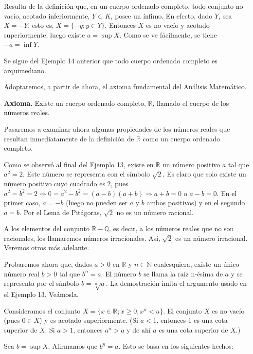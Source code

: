 \documentclass[12pt,oneside]{book}
\begin{document}
Resulta de la definición que, en un cuerpo ordenado completo, todo conjunto no vacío, acotado inferiormente, \( Y \subset K \), posee un ínfimo. En efecto, dado \( Y \), sea \( X = -Y \), esto es, \( X = \{-y ; y \in Y\} \). Entonces \( X \) es no vacío y acotado superiormente; luego existe \( a = \sup X \). Como se ve fácilmente, se tiene \( -a = \inf Y \).

Se sigue del Ejemplo 14 anterior que todo cuerpo ordenado completo es arquimediano.

Adoptaremos, a partir de ahora, el axioma fundamental del Análisis Matemático.

\textbf{Axioma.} Existe un cuerpo ordenado completo, \( \mathbb{R} \), llamado el cuerpo de los números reales.

Pasaremos a examinar ahora algunas propiedades de los números reales que resultan inmediatamente de la definición de \( \mathbb{R} \) como un cuerpo ordenado completo.

Como se observó al final del Ejemplo 13, existe en \(\mathbb{R}\) un número positivo \(a\) tal que \(a^2 = 2\). Este número se representa con el símbolo \(\sqrt{2}\). Es claro que solo existe un número positivo cuyo cuadrado es 2, pues \(a^2 = b^2 = 2 \Rightarrow 0 = a^2 - b^2 = (a-b)(a+b) \Rightarrow a + b = 0\) o \(a - b = 0\). En el primer caso, \(a = -b\) (luego no pueden ser \(a\) y \(b\) ambos positivos) y en el segundo \(a = b\). Por el Lema de Pitágoras, \(\sqrt{2}\) no es un número racional.

A los elementos del conjunto \(\mathbb{R} - \mathbb{Q}\), es decir, a los números reales que no son racionales, los llamaremos números irracionales. Así, \(\sqrt{2}\) es un número irracional. Veremos otros más adelante.

Probaremos ahora que, dados \(a > 0\) en \(\mathbb{R}\) y \(n \in \mathbb{N}\) cualesquiera, existe un único número real \(b > 0\) tal que \(b^n = a\). El número \(b\) se llama la raíz n-ésima de \(a\) y se representa por el símbolo \(b = \sqrt[n]{a}\). La demostración imita el argumento usado en el Ejemplo 13. Veámosla.

Consideramos el conjunto \(X = \{x \in \mathbb{R}; x \geq 0, x^n < a\}\). El conjunto \(X\) es no vacío (pues \(0 \in X\)) y es acotado superiormente. (Si \(a < 1\), entonces \(1\) es una cota superior de \(X\). Si \(a > 1\), entonces \(a^n > a\) y de ahí \(a\) es una cota superior de \(X\).)

Sea \(b = \sup X\). Afirmamos que \(b^n = a\). Esto se basa en los siguientes hechos:
\end{document}
